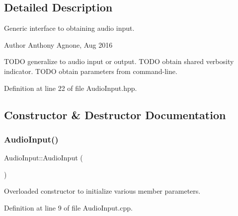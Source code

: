 \subsection{Detailed Description}
Generic interface to obtaining audio input. \begin{DoxyAuthor}{Author}
Anthony Agnone, Aug 2016
\end{DoxyAuthor}
T\+O\+DO generalize to audio input or output. T\+O\+DO obtain shared verbosity indicator. T\+O\+DO obtain parameters from command-\/line. 

Definition at line 22 of file Audio\+Input.\+hpp.



\subsection{Constructor \& Destructor Documentation}
\mbox{\label{classAudioInput_a51903411fbfb29b77f30a0ee3fbaa50e}} 
\subsubsection{\texorpdfstring{Audio\+Input()}{AudioInput()}}
{\footnotesize\ttfamily Audio\+Input\+::\+Audio\+Input (\begin{DoxyParamCaption}{ }\end{DoxyParamCaption})}

Overloaded constructor to initialize various member parameters. 

Definition at line 9 of file Audio\+Input.\+cpp.


